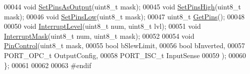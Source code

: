 \begin{DoxyCode}
00044     \textcolor{keywordtype}{void} \hyperlink{class_port_a15035cc63128ae28294c154527c9d2fe}{SetPinsAsOutput}(uint8\_t mask);
00045     \textcolor{keywordtype}{void} \hyperlink{class_port_a4c7069d8f3c95c2edbbb5945041c687d}{SetPinsHigh}(uint8\_t mask);
00046     \textcolor{keywordtype}{void} \hyperlink{class_port_aa0e48b7851cc1352c5e8ddc371351e21}{SetPinsLow}(uint8\_t mask);
00047     uint8\_t \hyperlink{class_port_ab13ab1f58e8f17fec681e38872ac56d9}{GetPins}();
00048     
00050     \textcolor{keywordtype}{void} \hyperlink{class_port_ae43736d7fff93b93d1d1dac27df64591}{InterruptLevel}(uint8\_t num, uint8\_t lvl);
00051     \textcolor{keywordtype}{void} \hyperlink{class_port_a638be122540b191c8cb84b61d6363d28}{InterruptMask}(uint8\_t num, uint8\_t mask);
00052     
00054     \textcolor{keywordtype}{void} \hyperlink{class_port_ab2f2ecab7c1402a03c87d866a8cd5380}{PinControl}(uint8\_t mask, 
00055         \textcolor{keywordtype}{bool} bSlewLimit,
00056         \textcolor{keywordtype}{bool} bInverted,
00057         PORT\_OPC\_t OutputConfig,
00058         PORT\_ISC\_t InputSense
00059         );
00060 \};
00061 
00062 
00063 \textcolor{preprocessor}{#endif}
\end{DoxyCode}

